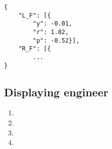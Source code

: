 \lstset{
	language=json,
	numbers=left,
	firstnumber=1
}
\begin{lstlisting}[caption={Example JSON code sent to front-end client.},label={lst:json}]
{
	"L_F": [{
		"y": -0.01,
		"r": 1.82,
		"p": -0.52}],
	"R_F": [{
		...
}
\end{lstlisting}


\subsection{Displaying engineer}
\begin{enumerate}
	\item   %
	\item   %
	\item   %
	\item   %
\end{enumerate}



